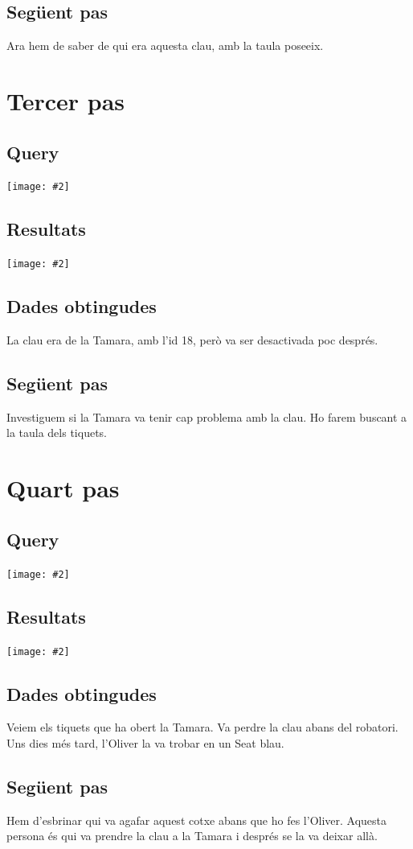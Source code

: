 \documentclass[a4paper,12pt]{article}
\newcommand{\mygraphic}[2][width=\textwidth]{\begin{center}
		\centering\texttt{[image: \#2]}\par
\end{center}}
\begin{document}
\subsection{Següent pas}
Ara hem de saber de qui era aquesta clau, amb la taula poseeix.

\newpage
\section{Tercer pas}
\subsection{Query}
\mygraphic{imatges/3a.png}
\subsection{Resultats}
\mygraphic{imatges/3b.png}
\subsection{Dades obtingudes}
La clau era de la Tamara, amb l'id 18, però va ser desactivada poc després.
\subsection{Següent pas}
Investiguem si la Tamara va tenir cap problema amb la clau. Ho farem buscant a la taula dels tiquets.

\newpage
\section{Quart pas}
\subsection{Query}
\mygraphic{imatges/4a.png}
\subsection{Resultats}
\mygraphic{imatges/4b.png}
\subsection{Dades obtingudes}
Veiem els tiquets que ha obert la Tamara. Va perdre la clau abans del robatori. Uns dies més tard, l'Oliver la va trobar en un Seat blau.
\subsection{Següent pas}
Hem d'esbrinar qui va agafar aquest cotxe abans que ho fes l'Oliver. Aquesta persona és qui va prendre la clau a la Tamara i després se la va deixar allà.
\end{document}
